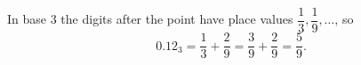 In base $3$ the digits after the point have place values $\dfrac{1}{3},\dfrac{1}{9},\dots$, so
\[
0.12_3=\dfrac{1}{3}+\dfrac{2}{9}=\dfrac{3}{9}+\dfrac{2}{9}=\boxed{\dfrac{5}{9}}.
\]
